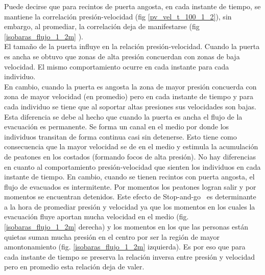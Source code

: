 Puede decirse que para recintos de puerta angosta, en cada instante de tiempo, se mantiene la correlación presión-velocidad (fig \ref{pv_vel_t_100_1_2}), sin embargo, al promediar, la correlación deja de manifestarse (fig \ref{isobaras_flujo_1_2m} ). \\
El tamaño de la puerta influye en la relación presión-velocidad. Cuando la puerta es ancha se obtuvo que zonas de alta presión concuerdan con zonas de baja velocidad. El mismo comportamiento ocurre en cada instante para cada individuo. \\
En cambio, cuando la puerta es angosta la zona de mayor presión concuerda con zona de mayor velocidad (en promedio) pero en cada instante de tiempo y para cada individuo se tiene que al soportar altas presiones sus velocidades son bajas. \\
Esta diferencia se debe al hecho que cuando la puerta es ancha el flujo de la evacuación es permanente. Se forma un canal en el medio por donde los individuos transitan de forma continua casi sin detenerse. Esto tiene como consecuencia que la mayor velocidad se de en el medio y estimula la acumulación de peatones en los costados (formando focos de alta presión). No hay diferencias en cuanto al comportamiento presión-velocidad que sienten los individuos en cada instante de tiempo.
En cambio, cuando se tienen recintos con puerta angosta, el flujo de evacuados es intermitente. Por momentos los peatones logran salir y por momentos se encuentran detenidos. Este efecto de Stop-and-go~\cite{stop-go} es determinante a la hora de promediar presión y velocidad ya que los momentos en los cuales la evacuación fluye aportan mucha velocidad en el medio (fig. \ref{isobaras_flujo_1_2m} derecha) y los momentos en los que las personas están quietas suman mucha presión en el centro por ser la región de mayor amontonamiento (fig. \ref{isobaras_flujo_1_2m} izquierda). Es por eso que para cada instante de tiempo se preserva la relación inversa entre presión y velocidad pero en promedio esta relación deja de valer.

